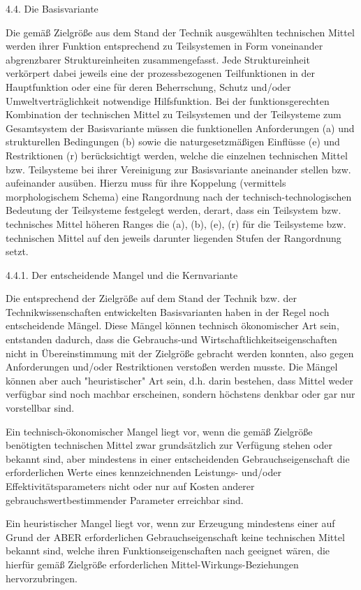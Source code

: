\documentclass[12pt,a4paper]{article}
\begin{document}
4.4. Die Basisvariante

Die gemäß Zielgröße aus dem Stand der Technik ausgewählten technischen Mittel werden ihrer Funktion entsprechend zu Teilsystemen in Form voneinander abgrenzbarer Struktureinheiten zusammengefasst. Jede Struktureinheit verkörpert dabei jeweils eine der prozessbezogenen Teilfunktionen in der Hauptfunktion oder eine für deren Beherrschung, Schutz und/oder Umweltverträglichkeit notwendige Hilfsfunktion. Bei der funktionsgerechten Kombination der tech­nischen Mittel zu Teilsystemen und der Teilsysteme zum Gesamtsystem der Basisvariante müssen die funktionellen Anforderungen (a) und strukturellen Bedingungen (b) sowie die naturgesetzmäßigen Einflüsse (e) und Restriktionen (r) berücksichtigt werden, welche die einzelnen technischen Mittel bzw. Teilsysteme bei ihrer Vereinigung zur Basisvariante aneinander stellen bzw. aufeinander ausüben. Hierzu muss für ihre Koppelung (vermittels morphologischem Schema) eine Rangordnung nach der technisch-technologischen Bedeutung der Teilsysteme festgelegt werden, derart, dass ein Teilsystem bzw. technisches Mittel höheren Ranges die (a), (b), (e), (r) für die Teilsysteme bzw. technischen Mittel auf den jeweils darunter liegenden Stufen der Rangordnung setzt.

4.4.1. Der entscheidende Mangel und die Kernvariante

Die entsprechend der Zielgröße auf dem Stand der Technik bzw. der Technikwissenschaften entwickelten Basisvarianten haben in der Regel noch entscheidende Mängel. Diese Mängel können technisch ökonomischer Art sein, entstanden dadurch, dass die Gebrauchs-und Wirtschaftlichkeitseigenschaften nicht in Übereinstimmung mit der Zielgröße gebracht werden konnten, also gegen Anforderungen und/oder Restriktionen verstoßen werden musste. Die Mängel können aber auch "heuristischer" Art sein, d.h. darin bestehen, dass Mittel weder verfügbar sind noch machbar erscheinen, sondern höchstens denkbar oder gar nur vorstellbar sind.

Ein technisch-ökonomischer Mangel liegt vor, wenn die gemäß Zielgröße benötigten technischen Mittel zwar grundsätzlich zur Verfügung stehen oder bekannt sind, aber mindestens in einer entscheidenden Gebrauchseigenschaft die erforderlichen Werte eines kennzeichnenden Leistungs- und/oder Effektivitätsparame­ters nicht oder nur auf Kosten anderer gebrauchswertbestimmen­der Parameter erreichbar sind.

Ein heuristischer Mangel liegt vor, wenn zur Erzeugung mindestens einer auf Grund der ABER erforderlichen Gebrauchseigenschaft keine technischen Mittel bekannt sind, welche ihren Funktionseigenschaften nach geeignet wären, die hierfür gemäß Zielgröße erforderlichen Mittel-Wirkungs-Beziehungen hervorzubringen.
\end{document}

